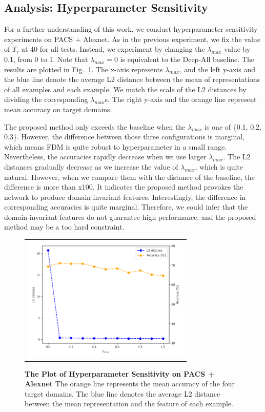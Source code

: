 \subsection{Analysis: Hyperparameter Sensitivity}
For a further understanding of this work, we conduct hyperparameter sensitivity experiments on PACS + Alexnet. As in the previous experiment, we fix the value of $T_r$ at 40 for all tests. Instead, we experiment by changing the $\lambda_{max}$ value by 0.1, from 0 to 1. Note that $\lambda_{max} = 0$ is equivalent to the Deep-All baseline. The results are plotted in Fig.~\ref{fig:analysis}. The x-axis represents $\lambda_{max}$, and the left y-axis and the blue line denote the average L2 distance between the mean of representations of all examples and each example. We match the scale of the L2 distances by dividing the corresponding $\lambda_{max}$s. The right y-axis and the orange line represent mean accuracy on target domains. 

The proposed method only exceeds the baseline when the $\lambda_{max}$ is one of \{0.1, 0.2, 0.3\}. However, the difference between those three configurations is marginal, which means FDM is quite robust to hyperparameter in a small range. Nevertheless, the accuracies rapidly decrease when we use larger $\lambda_{max}$. The L2 distances gradually decrease as we increase the value of $\lambda_{max}$, which is quite natural. However, when we compare them with the distance of the baseline, the difference is more than x100. It indicates the proposed method provokes the network to produce domain-invariant features. Interestingly, the difference in corresponding accuracies is quite marginal. Therefore, we could infer that the domain-invariant features do not guarantee high performance, and the proposed method may be a too hard constraint.

\begin{figure}[t]
	\centering
	\footnotesize
	\begin{tabular}{c}
		\includegraphics[width=8cm]{figures/analysis.png}
	\end{tabular}
	\vspace{-0.3cm}
	\caption{\textbf{The Plot of Hyperparameter Sensitivity on PACS + Alexnet} The orange line represents the mean accuracy of the four target domains. The blue line denotes the average L2 distance between the mean representation and the feature of each example.}\label{fig:analysis}
\end{figure}

